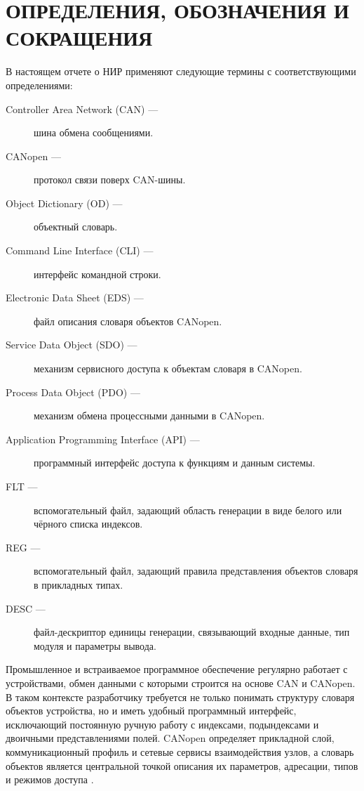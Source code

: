 \documentclass[a4paper,12pt]{article}
\begin{document}
\pagebreak


\tableofcontents
\pagebreak


\section*{\centering ОПРЕДЕЛЕНИЯ, ОБОЗНАЧЕНИЯ И СОКРАЩЕНИЯ}
В настоящем отчете о НИР применяют следующие термины с соответствующими определениями:
\begin{description}
  \item[Controller Area Network (CAN) ---] шина обмена сообщениями.
  \item[CANopen ---] протокол связи поверх CAN-шины. 
  \item[Object Dictionary (OD) ---] объектный словарь.
  \item[Command Line Interface (CLI) ---] интерфейс командной строки.
  \item[Electronic Data Sheet (EDS) ---] файл описания словаря объектов CANopen.
  \item[Service Data Object (SDO) ---] механизм сервисного доступа к объектам словаря в CANopen.
  \item[Process Data Object (PDO) ---] механизм обмена процессными данными в CANopen.
  \item[Application Programming Interface (API) ---] программный интерфейс доступа к функциям и данным системы.
  \item[FLT ---] вспомогательный файл, задающий область генерации в виде белого или чёрного списка индексов.
  \item[REG ---] вспомогательный файл, задающий правила представления объектов словаря в прикладных типах.
  \item[DESC ---] файл-дескриптор единицы генерации, связывающий входные данные, тип модуля и параметры вывода.
\end{description}

\pagebreak


Промышленное и встраиваемое программное обеспечение регулярно работает с устройствами,
обмен данными с которыми строится на основе CAN и CANopen. В таком контексте
разработчику требуется не только понимать структуру словаря объектов устройства, но и
иметь удобный программный интерфейс, исключающий постоянную ручную работу с индексами,
подындексами и двоичными представлениями полей. CANopen определяет прикладной слой,
коммуникационный профиль и сетевые сервисы взаимодействия узлов, а словарь объектов
является центральной точкой описания их параметров, адресации, типов и режимов доступа
\cite{cia_301_2011,csse_canopen_intro_2025,canopennode_od}.
\end{document}
